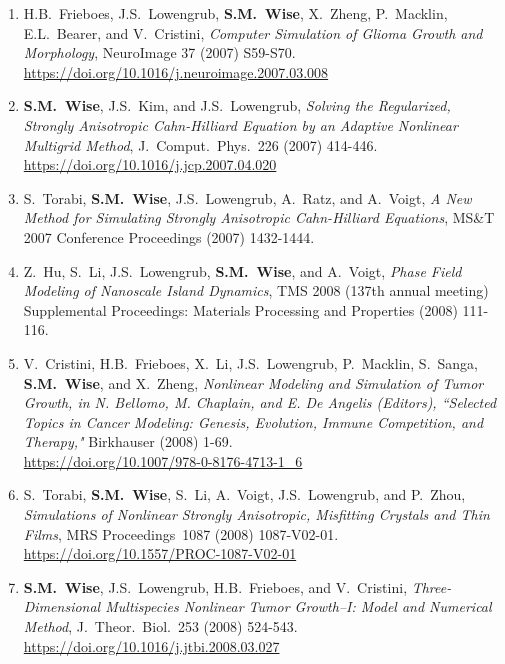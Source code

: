 \documentclass[11pt]{letter}
\begin{document}
\begin{enumerate}
    \item
H.B.~Frieboes, J.S.~Lowengrub, \textbf{S.M.~Wise}, X.~Zheng, P.~Macklin, E.L.~Bearer, and V.~Cristini, {\sl Computer Simulation of Glioma Growth and Morphology}, NeuroImage  37 (2007) S59-S70.
	\\
\url{https://doi.org/10.1016/j.neuroimage.2007.03.008}

    \item
\textbf{S.M.~Wise}, J.S.~Kim, and J.S.~Lowengrub, {\sl Solving the Regularized, Strongly Anisotropic Cahn-Hilliard Equation by an Adaptive Nonlinear Multigrid Method}, J.~Comput.~Phys.~226 (2007) 414-446.
	\\
\url{https://doi.org/10.1016/j.jcp.2007.04.020}

	\item
S.~Torabi, \textbf{S.M.~Wise}, J.S.~Lowengrub, A.~Ratz, and A.~Voigt, {\sl A New Method for Simulating Strongly Anisotropic Cahn-Hilliard Equations}, MS\&T 2007 Conference Proceedings (2007) 1432-1444.	

	\item
Z.~Hu, S.~Li, J.S.~Lowengrub, \textbf{S.M.~Wise}, and A.~Voigt, {\sl Phase Field Modeling of Nanoscale Island Dynamics}, TMS 2008 (137th annual meeting) Supplemental Proceedings: Materials Processing and Properties (2008) 111-116.

	\item
V.~Cristini, H.B.~Frieboes, X.~Li, J.S.~Lowengrub, P.~Macklin, S.~Sanga, \textbf{S.M.~Wise}, and X.~Zheng, {\sl Nonlinear Modeling and Simulation of Tumor Growth, in N. Bellomo, M. Chaplain, and E. De Angelis (Editors), ``Selected Topics in Cancer Modeling: Genesis, Evolution, Immune Competition, and Therapy,"}  Birkhauser (2008) 1-69.
	\\
\url{https://doi.org/10.1007/978-0-8176-4713-1_6}

	\item
S.~Torabi, \textbf{S.M.~Wise}, S.~Li, A.~Voigt, J.S.~Lowengrub, and P.~Zhou, {\sl Simulations of Nonlinear Strongly Anisotropic, Misfitting Crystals and Thin Films}, MRS Proceedings~1087 (2008) 1087-V02-01. 
	\\
\url{https://doi.org/10.1557/PROC-1087-V02-01}

	\item
\textbf{S.M.~Wise}, J.S.~Lowengrub, H.B.~Frieboes, and V.~Cristini, {\sl Three-Dimensional Multispecies Nonlinear Tumor Growth--I: Model and Numerical Method}, J.~Theor.~Biol.~253 (2008) 524-543.
	\\
\url{https://doi.org/10.1016/j.jtbi.2008.03.027}


\end{enumerate}
\end{document}
